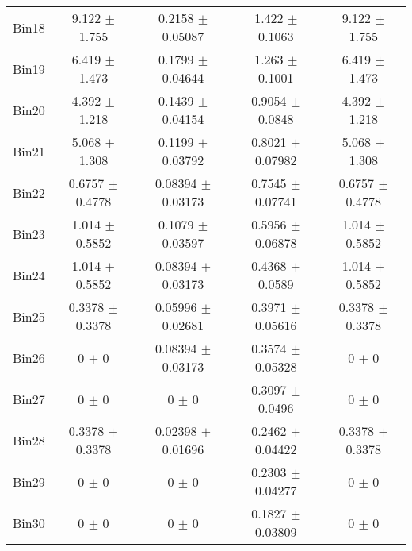 \begin{tabular}{@{\extracolsep{4pt}}lcccc@{}}
     Bin18 & 9.122 $\pm$ 1.755 & 0.2158 $\pm$ 0.05087 & 1.422 $\pm$ 0.1063 & 9.122 $\pm$ 1.755 \\ 
     Bin19 & 6.419 $\pm$ 1.473 & 0.1799 $\pm$ 0.04644 & 1.263 $\pm$ 0.1001 & 6.419 $\pm$ 1.473 \\ 
     Bin20 & 4.392 $\pm$ 1.218 & 0.1439 $\pm$ 0.04154 & 0.9054 $\pm$ 0.0848 & 4.392 $\pm$ 1.218 \\ 
     Bin21 & 5.068 $\pm$ 1.308 & 0.1199 $\pm$ 0.03792 & 0.8021 $\pm$ 0.07982 & 5.068 $\pm$ 1.308 \\ 
     Bin22 & 0.6757 $\pm$ 0.4778 & 0.08394 $\pm$ 0.03173 & 0.7545 $\pm$ 0.07741 & 0.6757 $\pm$ 0.4778 \\ 
     Bin23 & 1.014 $\pm$ 0.5852 & 0.1079 $\pm$ 0.03597 & 0.5956 $\pm$ 0.06878 & 1.014 $\pm$ 0.5852 \\ 
     Bin24 & 1.014 $\pm$ 0.5852 & 0.08394 $\pm$ 0.03173 & 0.4368 $\pm$ 0.0589 & 1.014 $\pm$ 0.5852 \\ 
     Bin25 & 0.3378 $\pm$ 0.3378 & 0.05996 $\pm$ 0.02681 & 0.3971 $\pm$ 0.05616 & 0.3378 $\pm$ 0.3378 \\ 
     Bin26 & 0 $\pm$ 0 & 0.08394 $\pm$ 0.03173 & 0.3574 $\pm$ 0.05328 & 0 $\pm$ 0 \\ 
     Bin27 & 0 $\pm$ 0 & 0 $\pm$ 0 & 0.3097 $\pm$ 0.0496 & 0 $\pm$ 0 \\ 
     Bin28 & 0.3378 $\pm$ 0.3378 & 0.02398 $\pm$ 0.01696 & 0.2462 $\pm$ 0.04422 & 0.3378 $\pm$ 0.3378 \\ 
     Bin29 & 0 $\pm$ 0 & 0 $\pm$ 0 & 0.2303 $\pm$ 0.04277 & 0 $\pm$ 0 \\ 
     Bin30 & 0 $\pm$ 0 & 0 $\pm$ 0 & 0.1827 $\pm$ 0.03809 & 0 $\pm$ 0 \\ 
\hline\hline
  \end{tabular}
